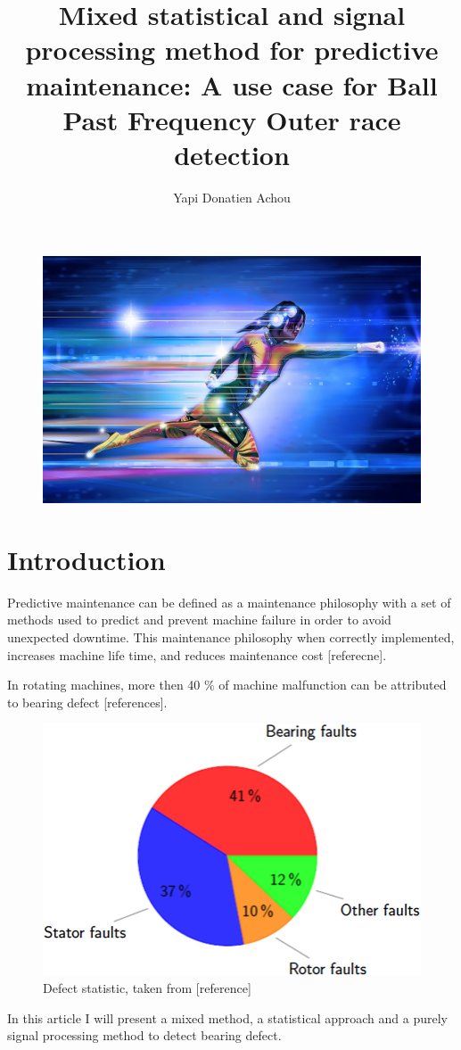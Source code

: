 \documentclass[11pt, oneside]{article}   	%
\title{Mixed statistical and signal processing method for predictive maintenance: A use case for Ball Past Frequency Outer race detection}
\author{Yapi Donatien Achou}
\begin{document}
\maketitle
\begin{figure}[H] %
   \centering
   \includegraphics[width=5in]{front4} 
   \caption{}
   \label{fig:example}
\end{figure}
\section{Introduction}
Predictive maintenance can be defined as a maintenance philosophy with a set of methods used to predict and prevent machine failure in order to avoid unexpected downtime. This maintenance philosophy when correctly implemented, increases machine life time, and reduces maintenance cost [referecne].
\begin{flushleft}
In rotating machines, more then 40 $\%$ of machine malfunction can be attributed to bearing defect [references]. 
\end{flushleft}
\begin{figure}[H] %
   \centering
   \includegraphics[width=5in]{pie.png} 
   \caption{Defect statistic, taken from [reference]}
   \label{fig:pie}
\end{figure}
In this article I will present a mixed method, a statistical approach and  a purely signal processing method to detect bearing defect.
\end{document}

